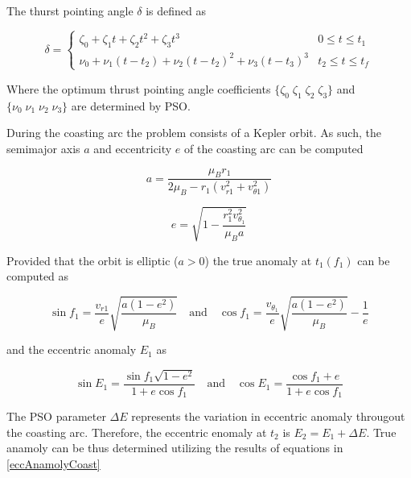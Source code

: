 \noindent The thurst pointing angle $\delta$ is defined as 

\begin{equation}
    \delta = 
    \begin{cases}
        \zeta_0 +\zeta_1t+\zeta_2t^2 +\zeta_3t^3 & 0 \leq t \leq t_1 \\
        \nu_0 + \nu_1(t-t_2) + \nu_2(t-t_2)^2+\nu_3(t-t_3)^3 & t_2 \leq t \leq t_f
    \end{cases}
    \label{delta_eq}
\end{equation} \linebreak

\noindent Where the optimum thrust pointing angle coefficients $\{\zeta_0 \; \zeta_1 \; \zeta_2 \; \zeta_3 \}$
and $\{\nu_0 \; \nu_1 \; \nu_2 \; \nu_3\}$ are determined by PSO. \newline

During the coasting arc the problem consists of a Kepler orbit. As such, the semimajor axis $a$ and eccentricity $e$ of the coasting arc can be computed

\begin{equation}
a = \dfrac{\mu_Br_1}{2\mu_B - r_1(v_{r1}^2+v_{\theta1}^2)}
\label{acoast}
\end{equation}

\begin{equation}
e = \sqrt{1-\dfrac{r_1^2v_{\theta_1}^2}{\mu_Ba}}
\label{ecoast}
\end{equation} \newline

\noindent Provided that the orbit is elliptic ($a > 0$) the true anomaly at $t_1(f_1)$ can be computed as

\begin{equation}
\sin f_1 = \dfrac{v_{r1}}{e}\sqrt{\dfrac{a(1-e^2)}{\mu_B}} \quad \text{and} \quad \cos{f_1} = \dfrac{v_{\theta_1}}{e}\sqrt{\dfrac{a(1-e^2)}{\mu_B}}-\dfrac{1}{e}
\label{trueAnamolyCoast}
\end{equation} \newline

\noindent and the eccentric anomaly $E_1$ as 

\begin{equation}
\sin{E_1} = \dfrac{\sin{f_1}\sqrt{1-e^2}}{1+e\cos{f_1}} \quad \text{and} \quad 
\cos{E_1} = \dfrac{\cos{f_1}+e}{1+e\cos{f_1}}
\label{eccAnamolyCoast}
\end{equation}

\noindent The PSO parameter $\Delta E$ represents the variation in eccentric anomaly througout the coasting arc. Therefore, the eccentric enomaly at $t_2$ is $E_2 = E_1 + \Delta E$. True anamoly can be
thus determined utilizing the results of equations in \ref{eccAnamolyCoast}

